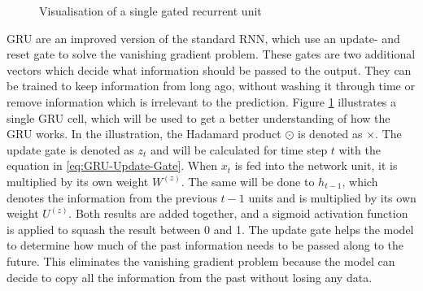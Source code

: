 \begin{figure}[htbp]
    \caption{Visualisation of a single gated recurrent unit}
    \label{fig:GRU-Visualisation}
\end{figure}
\noindent
\gls{GRU} are an improved version of the standard \gls{RNN}, which use an update- and reset gate to solve the vanishing gradient problem. These gates are two additional vectors which decide what information should be passed to the output. They can be trained to keep information from long ago, without washing it through time or remove information which is irrelevant to the prediction. Figure \ref{fig:GRU-Visualisation} illustrates a single \gls{GRU} cell, which will be used to get a better understanding of how the \gls{GRU} works. In the illustration, the Hadamard product $\odot$ is denoted as $\times$.
\newline
\newline
The update gate is denoted as $z_t$ and will be calculated for time step $t$ with the equation in \ref{eq:GRU-Update-Gate}. When $x_t$ is fed into the network unit, it is multiplied by its own weight $W^{(z)}$. The same will be done to $h_{t-1}$, which denotes the information from the previous $t-1$ units and is multiplied by its own weight $U^{(z)}$. Both results are added together, and a sigmoid activation function is applied to squash the result between 0 and 1. The update gate helps the model to determine how much of the past information needs to be passed along to the future. This eliminates the vanishing gradient problem because the model can decide to copy all the information from the past without losing any data.
